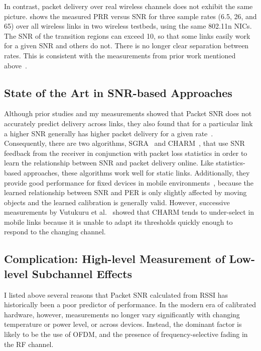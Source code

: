 In contrast, packet delivery over real wireless channels does not exhibit the same picture.  shows the measured PRR versus SNR for three sample rates (6.5\Mbps, 26\Mbps, and 65\Mbps) over all wireless links in two wireless testbeds, using the same 802.11n NICs. The SNR of the transition regions can exceed 10\dB, so that some links easily work for a given SNR and others do not. There is no longer clear separation between rates. This is consistent with the measurements from prior work mentioned above~\cite{Aguayo_Roofnet, Judd_CHARM, Reis_interference, Zhang_SNRguided, Zhao_sensys03}.

\subsection{State of the Art in SNR-based Approaches}
Although prior studies and my measurements showed that Packet SNR does not accurately predict delivery across links, they also found that for a particular link a higher SNR generally has higher packet delivery for a given rate~\cite{Aguayo_Roofnet,Judd_CHARM,Zhang_SNRguided}. Consequently, there are two algorithms, SGRA~\cite{Zhang_SNRguided} and CHARM~\cite{Judd_CHARM}, that use SNR feedback from the receiver in conjunction with packet loss statistics in order to learn the relationship between SNR and packet delivery online. Like statistics-based approaches, these algorithms work well for static links. Additionally, they provide good performance for fixed devices in mobile environments~\cite{Judd_CHARM}, because the learned relationship between SNR and PER is only slightly affected by moving objects and the learned calibration is generally valid. However, successive measurements by Vutukuru et al.~\cite{Vutukuru_SoftRate} showed that CHARM tends to under-select in mobile links because it is unable to adapt its thresholds quickly enough to respond to the changing channel.

\subsection{Complication: High-level Measurement of Low-level Subchannel Effects}
I listed above several reasons that Packet SNR calculated from RSSI has historically been a poor predictor of performance. In the modern era of calibrated hardware, however, measurements no longer vary significantly with changing temperature or power level, or across devices. Instead, the dominant factor is likely to be the use of OFDM, and the presence of frequency-selective fading in the RF channel.

